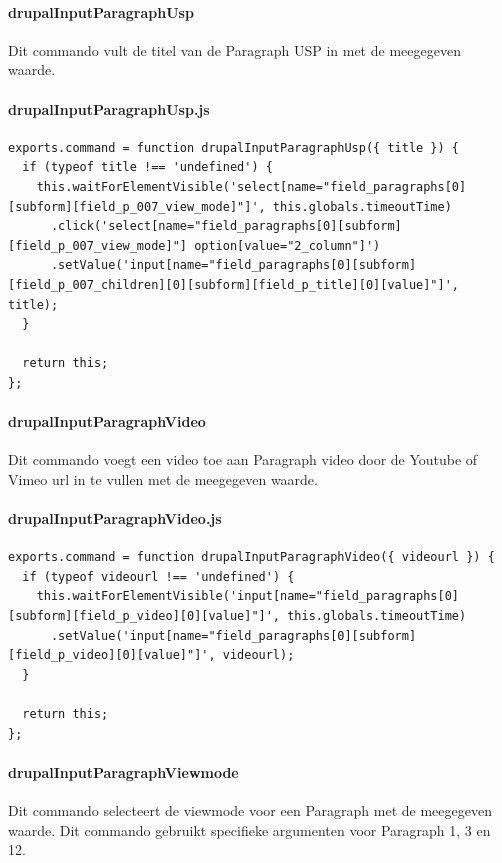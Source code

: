 \clearpage
\paragraph{drupalInputParagraphUsp}
\label{commando24}
Dit commando vult de titel van de Paragraph USP in met de meegegeven waarde.
\paragraph{drupalInputParagraphUsp.js}
\begin{lstlisting}[breaklines=true]
exports.command = function drupalInputParagraphUsp({ title }) {
  if (typeof title !== 'undefined') {
    this.waitForElementVisible('select[name="field_paragraphs[0][subform][field_p_007_view_mode]"]', this.globals.timeoutTime)
      .click('select[name="field_paragraphs[0][subform][field_p_007_view_mode]"] option[value="2_column"]')
      .setValue('input[name="field_paragraphs[0][subform][field_p_007_children][0][subform][field_p_title][0][value]"]', title);
  }

  return this;
};
\end{lstlisting}


\clearpage
\paragraph{drupalInputParagraphVideo}
\label{commando25}
Dit commando voegt een video toe aan Paragraph video door de Youtube of Vimeo url in te vullen met de meegegeven waarde.
\paragraph{drupalInputParagraphVideo.js}
\begin{lstlisting}[breaklines=true]
exports.command = function drupalInputParagraphVideo({ videourl }) {
  if (typeof videourl !== 'undefined') {
    this.waitForElementVisible('input[name="field_paragraphs[0][subform][field_p_video][0][value]"]', this.globals.timeoutTime)
      .setValue('input[name="field_paragraphs[0][subform][field_p_video][0][value]"]', videourl);
  }

  return this;
};
\end{lstlisting}


\clearpage
\paragraph{drupalInputParagraphViewmode}
\label{commando26}
Dit commando selecteert de viewmode voor een Paragraph met de meegegeven waarde. Dit commando gebruikt specifieke argumenten voor Paragraph 1, 3 en 12.
